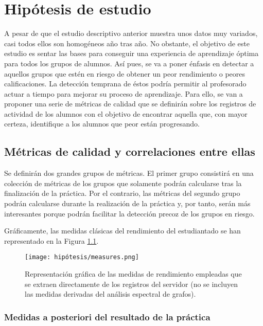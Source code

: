 \chapter{Hipótesis de estudio}\label{sec:chapterVII}

A pesar de que el estudio descriptivo anterior muestra unos datos muy variados, casi todos ellos son homogéneos año tras año. No obstante, el objetivo de este estudio es sentar las bases para conseguir una experiencia de aprendizaje óptima para todos los grupos de alumnos. Así pues, se va a poner énfasis en detectar a aquellos grupos que estén en riesgo de obtener un peor rendimiento o peores calificaciones. La detección temprana de éstos podría permitir al profesorado actuar a tiempo para mejorar su proceso de aprendizaje. Para ello, se van a proponer una serie de métricas de calidad que se definirán sobre los registros de actividad de los alumnos con el objetivo de encontrar aquella que, con mayor certeza, identifique a los alumnos que peor están progresando.

\section{Métricas de calidad y correlaciones entre ellas}

Se definirán dos grandes grupos de métricas. El primer grupo consistirá en una colección de métricas de los grupos que solamente podrán calcularse tras la finalización de la práctica. Por el contrario, las métricas del segundo grupo podrán calcularse durante la realización de la práctica y, por tanto, serán más interesantes porque podrán facilitar la detección precoz de los grupos en riesgo.

Gráficamente, las medidas clásicas del rendimiento del estudiantado se han representado en la Figura \ref{fig:measures}.

\begin{figure}[H]
    \centering
    \texttt{[image: hipótesis/measures.png]}
    \caption{Representación gráfica de las medidas de rendimiento empleadas que se extraen directamente de los registros del servidor (no se incluyen las medidas derivadas del análisis espectral de grafos).}
    \label{fig:measures}
\end{figure}

\subsection{Medidas a posteriori del resultado de la práctica}

